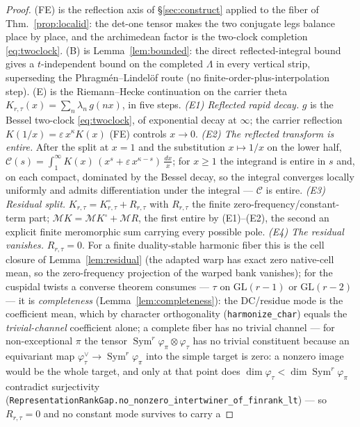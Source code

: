 \documentclass[11pt]{article}
\theoremstyle{definition}
\newcommand{\Sym}{\operatorname{Sym}}
\begin{document}
\begin{proof}
\textup{(FE)} is the reflection axis of \S\ref{sec:construct} applied to the fiber of
Thm.~\ref{prop:localid}: the det-one tensor makes the two conjugate legs balance place by place, and the
archimedean factor is the two-clock completion \eqref{eq:twoclock}. \textup{(B)} is Lemma~\ref{lem:bounded}: the direct reflected-integral bound gives a $t$-independent bound on the completed $\Lambda$ in every vertical strip, superseding the Phragm\'en--Lindel\"of route (no finite-order-plus-interpolation step).
\textup{(E)} is the Riemann--Hecke continuation on the carrier theta $K_{r,\tau}(x)=\sum_n\lambda_n\,g(nx)$,
in five steps.
\emph{(E1) Reflected rapid decay.} $g$ is the Bessel two-clock \eqref{eq:twoclock}, of exponential decay at
$\infty$; the carrier reflection $K(1/x)=\varepsilon\,x^{\kappa}K(x)$ \textup{(FE)} controls $x\to0$.
\emph{(E2) The reflected transform is entire.} After the split at $x=1$ and the substitution $x\mapsto1/x$
on the lower half, $\mathcal C(s)=\int_1^\infty K(x)\,(x^{s}+\varepsilon\,x^{\kappa-s})\,\tfrac{dx}{x}$; for
$x\ge1$ the integrand is entire in $s$ and, on each compact, dominated by the Bessel decay, so the integral
converges locally uniformly and admits differentiation under the integral --- $\mathcal C$ is entire.
\emph{(E3) Residual split.} $K_{r,\tau}=K^\circ_{r,\tau}+R_{r,\tau}$ with $R_{r,\tau}$ the finite
zero-frequency/constant-term part; $\mathcal M K=\mathcal M K^\circ+\mathcal M R$, the first entire by
\textup{(E1)--(E2)}, the second an explicit finite meromorphic sum carrying every possible pole.
\emph{(E4) The residual vanishes.} $R_{r,\tau}=0$. For a finite duality-stable harmonic fiber this is the
cell closure of Lemma~\ref{lem:residual} (the adapted warp has exact zero native-cell mean, so the
zero-frequency projection of the warped bank vanishes); for the cuspidal twists a converse theorem consumes
--- $\tau$ on $\mathrm{GL}(r-1)$ or $\mathrm{GL}(r-2)$ --- it is \emph{completeness}
(Lemma~\ref{lem:completeness}): the DC/residue mode is the coefficient mean, which by character orthogonality
(\texttt{harmonize\_char}) equals the \emph{trivial-channel} coefficient alone; a complete fiber has no
trivial channel --- for non-exceptional $\pi$ the tensor $\Sym^r\varphi_\pi\otimes\varphi_\tau$ has no trivial
constituent because an equivariant map $\varphi_\tau^\vee\to\Sym^r\varphi_\pi$ into the simple target
is zero: a nonzero image would be the whole target, and only at that point does
$\dim\varphi_\tau<\dim\Sym^r\varphi_\pi$ contradict surjectivity
(\texttt{RepresentationRankGap.no\_nonzero\_intertwiner\_of\_finrank\_lt}) --- so $R_{r,\tau}=0$ and no constant mode survives to carry a

\end{proof}
\end{document}
